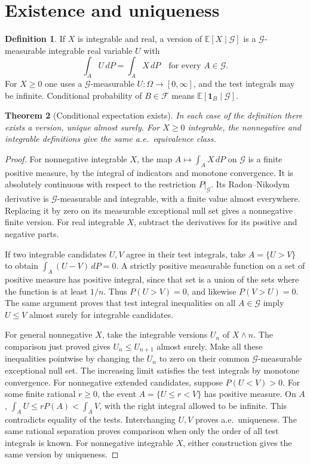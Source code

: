 \documentclass[11pt,oneside,openany]{book}
\theoremstyle{plain}
\newtheorem{theorem}{Theorem}[chapter]
\theoremstyle{definition}
\newtheorem{definition}[theorem]{Definition}
\theoremstyle{remark}
\begin{document}
\section{Existence and uniqueness}
\label{p03-01}

\begin{definition}
If \(X\) is integrable and real, a version of
\(\mathbb E[X\mid\mathcal G]\) is a \(\mathcal G\)-measurable
integrable real variable \(U\) with
\[
 \int_A U\,dP=\int_A X\,dP
 \quad\text{for every } A\in\mathcal G .
\]
For \(X\ge0\) one uses a \(\mathcal G\)-measurable
\(U\colon\Omega\to[0,\infty]\), and the test integrals may be
infinite. Conditional probability of \(B\in\mathcal F\) means
\(\mathbb E[\mathbf 1_B\mid\mathcal G]\).
\end{definition}

\begin{theorem}[Conditional expectation exists]
\label{thm:prob-condexp-exists}
In each case of the definition there exists a version, unique almost
surely. For \(X\ge0\) integrable, the nonnegative and integrable
definitions give the same a.e.\ equivalence class.
\end{theorem}
\begin{proof}
For nonnegative integrable \(X\), the map
\(A\mapsto\int_A X\,dP\) on \(\mathcal G\) is a finite positive
measure, by the integral of indicators and monotone convergence.
It is absolutely continuous with respect to the restriction
\(P|_{\mathcal G}\). Its Radon--Nikodym derivative is
\(\mathcal G\)-measurable and integrable, with a finite value
almost everywhere. Replacing it by zero on its measurable
exceptional null set gives a nonnegative finite version.
For real integrable \(X\), subtract the derivatives for its
positive and negative parts.

If two integrable candidates \(U,V\) agree in their test
integrals, take \(A=\{U>V\}\) to obtain
\(\int_A(U-V)\,dP=0\). A strictly positive measurable function
on a set of positive measure has positive integral, since that
set is a union of the sets where the function is at least \(1/n\).
Thus \(P(U>V)=0\), and likewise \(P(V>U)=0\).
The same argument proves that test integral inequalities on all
\(A\in\mathcal G\) imply \(U\le V\) almost surely for integrable
candidates.

For general nonnegative \(X\), take the integrable versions \(U_n\)
of \(X\wedge n\). The comparison just proved gives
\(U_n\le U_{n+1}\) almost surely. Make all these inequalities
pointwise by changing the \(U_n\) to zero on their common
\(\mathcal G\)-measurable exceptional null set. The increasing
limit satisfies the test integrals by monotone convergence.
For nonnegative extended candidates, suppose \(P(U<V)>0\).
For some finite rational \(r\ge0\), the event
\(A=\{U\le r<V\}\) has positive measure. On \(A\),
\(\int_A U\le rP(A)<\int_A V\), with the right integral allowed
to be infinite. This contradicts equality of the tests.
Interchanging \(U,V\) proves a.e.\ uniqueness. The same rational
separation proves comparison when only the order of all test
integrals is known. For nonnegative integrable \(X\), either
construction gives the same version by uniqueness.
\end{proof}
\end{document}
